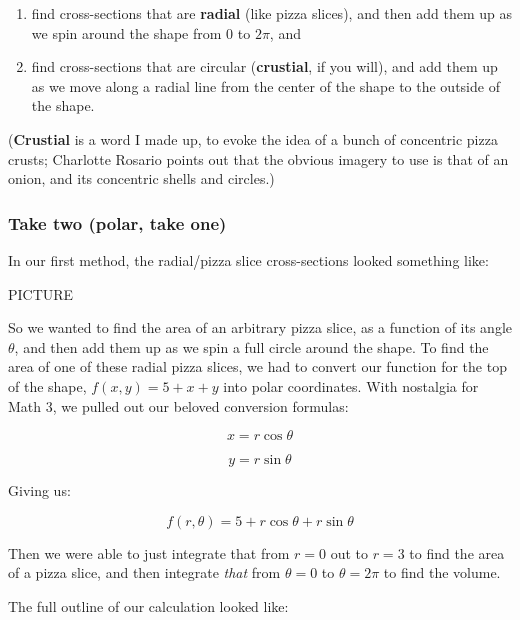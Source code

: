 \documentclass[
]{article}
\providecommand{\tightlist}{%
  \setlength{\itemsep}{0pt}\setlength{\parskip}{0pt}}
\begin{document}
\begin{enumerate}
\def\labelenumi{\arabic{enumi}.}
\tightlist
\item
  find cross-sections that are \textbf{radial} (like pizza slices), and then add them up as we spin around the shape from \(0\) to \(2\pi\), and
\item
  find cross-sections that are circular (\textbf{crustial}, if you will), and add them up as we move along a radial line from the center of the shape to the outside of the shape.
\end{enumerate}

(\textbf{Crustial} is a word I made up, to evoke the idea of a bunch of concentric pizza crusts; Charlotte Rosario points out that the obvious imagery to use is that of an onion, and its concentric shells and circles.)

\hypertarget{take-two-polar-take-one}{%
\subsubsection{Take two (polar, take one)}\label{take-two-polar-take-one}}

In our first method, the radial/pizza slice cross-sections looked something like:

PICTURE

So we wanted to find the area of an arbitrary pizza slice, as a function of its angle \(\theta\), and then add them up as we spin a full circle around the shape. To find the area of one of these radial pizza slices, we had to convert our function for the top of the shape, \(f(x,y)=5+x+y\) into polar coordinates. With nostalgia for Math 3, we pulled out our beloved conversion formulas:

\[x=r\cos\theta\]

\[y=r\sin\theta\]

Giving us:

\[f(r,\theta)= 5+r\cos\theta+r\sin\theta\]

Then we were able to just integrate that from \(r=0\) out to \(r=3\) to find the area of a pizza slice, and then integrate \emph{that} from \(\theta=0\) to \(\theta=2\pi\) to find the volume.

The full outline of our calculation looked like:
\end{document}
